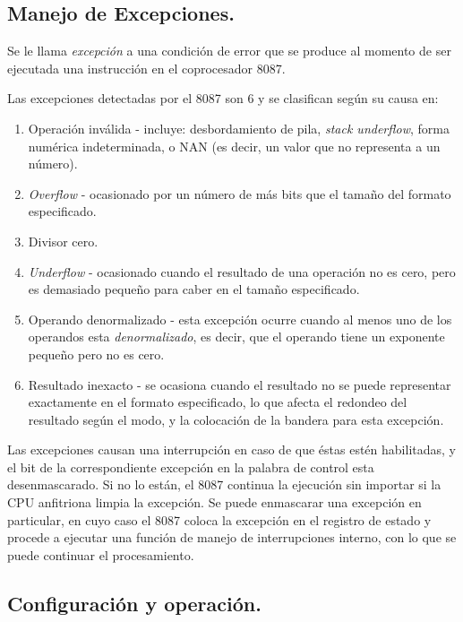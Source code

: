 \subsection{Manejo de Excepciones.}
\label{Subsection:excep8087}

Se le llama {\it excepci\'on\/} a una condici\'on de error que se produce al momento de ser %
ejecutada una instrucci\'on en el coprocesador 8087.

Las excepciones detectadas por el 8087 son 6 y se clasifican seg\'un su causa en:

\begin{enumerate}
\item Operaci\'on inv\'alida - incluye: desbordamiento de pila, {\it stack underflow\/}, %
forma num\'erica indeterminada, o NAN (es decir, un valor que no representa a un n\'umero).
\item {\it Overflow\/} - ocasionado por un n\'umero de m\'as bits que el tama\~no del %
formato especificado.
\item Divisor cero.
\item {\it Underflow\/} - ocasionado cuando el resultado de una operaci\'on no es cero, pero %
es demasiado peque\~no para caber en el tama\~no especificado.
\item Operando denormalizado - esta excepci\'on ocurre cuando al menos uno de los operandos %
esta {\it denormalizado\/}, es decir, que el operando tiene un exponente peque\~no pero no es %
cero.
\item Resultado inexacto - se ocasiona cuando el resultado no se puede representar exactamente %
en el formato especificado, lo que afecta el redondeo  del resultado seg\'un el modo, y la %
colocaci\'on de la bandera para esta excepci\'on.
\end{enumerate}

Las excepciones causan una interrupci\'on en caso de que \'estas est\'en habilitadas, y el bit %
de la correspondiente excepci\'on en la palabra de control esta desenmascarado. Si no lo %
est\'an, el 8087 continua la ejecuci\'on sin importar si la CPU anfitriona limpia la %
excepci\'on. Se puede enmascarar una excepci\'on en particular, en cuyo caso el 8087 coloca la %
excepci\'on en el registro de estado y procede a ejecutar una funci\'on de manejo de %
interrupciones interno, con lo que se puede continuar el procesamiento.


\subsection{Configuraci\'on y operaci\'on.}
\label{Subsection:confop8087}

